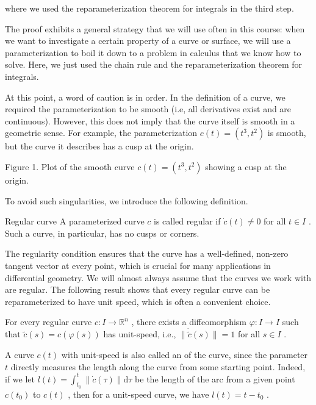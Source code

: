 where we used the reparameterization theorem for integrals in the third step.

The proof exhibits a general strategy that we will use often in this course: when we want to investigate a certain property of a curve or surface, we will use a parameterization to boil it down to a problem in calculus that we know how to solve. Here, we just used the chain rule and the reparameterization theorem for integrals.

At this point, a word of caution is in order. In the definition of a curve, we required the parameterization to be smooth (i.e, all derivatives exist and are continuous). However, this does not imply that the curve itself is smooth in a geometric sense. For example, the parameterization \(c\left( t\right)  = \left( {{t}^{3},{t}^{2}}\right)\) is smooth, but the curve it describes has a cusp at the origin.


Figure 1. Plot of the smooth curve \(c\left( t\right)  = \left( {{t}^{3},{t}^{2}}\right)\) showing a cusp at the origin.

To avoid such singularities, we introduce the following definition.


\begin{definition}{Regular curve}
    A parameterized curve \(c\) is called regular if \(\dot{c}\left( t\right)  \neq  0\) for all \(t \in  I\) . Such a curve, in particular, has no cusps or corners.
\end{definition}

The regularity condition ensures that the curve has a well-defined, non-zero tangent vector at every point, which is crucial for many applications in differential geometry. We will almost always assume that the curves we work with are regular. The following result shows that every regular curve can be reparameterized to have unit speed, which is often a convenient choice.

\begin{proposition}{}
    For every regular curve \(c : I \rightarrow  {\mathbb{R}}^{n}\) , there exists a diffeomorphism \(\varphi  : I \rightarrow  I\) such that \(\widetilde{c}\left( s\right)  = c\left( {\varphi \left( s\right) }\right)\) has unit-speed, i.e., \(\parallel \dot{\widetilde{c}}\left( s\right) \parallel  = 1\) for all \(s \in  I\) .
\end{proposition}



A curve \(c\left( t\right)\) with unit-speed is also called an  of the curve, since the parameter \(t\) directly measures the length along the curve from some starting point. Indeed, if we let \(l\left( t\right)  = {\int }_{{t}_{0}}^{t}\parallel \dot{c}\left( \tau \right) \parallel \mathrm{d}\tau\) be the length of the arc from a given point \(c\left( {t}_{0}\right)\) to \(c\left( t\right)\) , then for a unit-speed curve, we have \(l\left( t\right)  = t - {t}_{0}\) .

